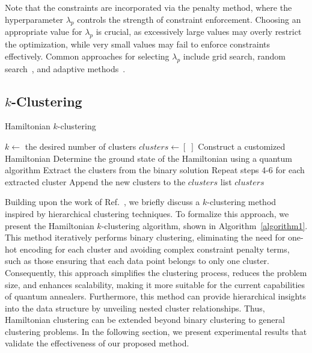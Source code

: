 \documentclass[showpacs,twocolumn,superscriptaddress]{revtex4-2}
\begin{document}
Note that the constraints are incorporated via the penalty method, where the hyperparameter $\lambda_p$ controls the strength of constraint enforcement. Choosing an appropriate value for $\lambda_p$ is crucial, as excessively large values may overly restrict the optimization, while very small values may fail to enforce constraints effectively. Common approaches for selecting $\lambda_p$ include grid search, random search~\cite{10.5555/2188385.2188395}, and adaptive methods~\cite{NIPS2012_05311655}.

\subsection{$k$-Clustering}

\begin{algorithm}[H]
\caption{Hamiltonian $k$-clustering}
\label{algorithm1}
\begin{algorithmic}[1] %
\State $k \gets$ the desired number of clusters
\State $clusters \gets \left\lbrack\; \right\rbrack$ 
    \State Construct a customized Hamiltonian
    \State Determine the ground state of the Hamiltonian using a quantum algorithm
    \State Extract the clusters from the binary solution
    \State Repeat steps 4-6 for each extracted cluster
    \State Append the new clusters to the $clusters$ list
\EndWhile
\State \Return $clusters$
\end{algorithmic}
\end{algorithm}

Building upon the work of Ref.~\cite{Kumar_2018}, we briefly discuss a $k$-clustering method inspired by hierarchical clustering techniques. To formalize this approach, we present the Hamiltonian $k$-clustering algorithm, shown in Algorithm~\ref{algorithm1}. This method iteratively performs binary clustering, eliminating the need for one-hot encoding for each cluster and avoiding complex constraint penalty terms, such as those ensuring that each data point belongs to only one cluster. Consequently, this approach simplifies the clustering process, reduces the problem size, and enhances scalability, making it more suitable for the current capabilities of quantum annealers. Furthermore, this method can provide hierarchical insights into the data structure by unveiling nested cluster relationships. Thus, Hamiltonian clustering can be extended beyond binary clustering to general clustering problems.
In the following section, we present experimental results that validate the effectiveness of our proposed method.
\end{document}
